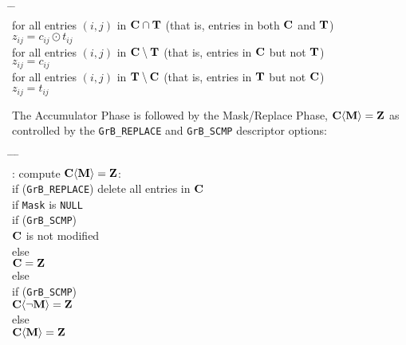 \documentclass[12pt]{article}
\begin{document}
    {\small
    \begin{tabbing}
    \hspace{2em} \= \hspace{2em} \= \hspace{2em} \= \\
    \> for all entries $(i,j)$ in ${\bf C \cap T}$
    (that is, entries in both ${\bf C}$ and ${\bf T}$) \\
    \> \> $z_{ij} = c_{ij} \odot t_{ij}$ \\
    \> for all entries $(i,j)$ in ${\bf C \setminus T}$
    (that is, entries in ${\bf C}$ but not ${\bf T}$) \\
    \> \> $z_{ij} = c_{ij}$ \\
    \> for all entries $(i,j)$ in ${\bf T \setminus C}$
    (that is, entries in ${\bf T}$ but not ${\bf C}$) \\
    \> \> $z_{ij} = t_{ij}$
    \end{tabbing} }
The Accumulator Phase is followed by the Mask/Replace Phase, ${\bf C \langle M \rangle = Z}$
as controlled by the \verb'GrB_REPLACE' and \verb'GrB_SCMP' descriptor options:
    \vspace{-0.2in}
    {\small
    \begin{tabbing}
    \hspace{2em} \= \hspace{2em} \= \hspace{2em} \= \hspace{2em} \= \\
    : compute ${\bf C \langle M \rangle = Z}$: \\
    \> \> if (\verb'GrB_REPLACE') delete all entries in ${\bf C}$ \\
    \> \> if \verb'Mask' is \verb'NULL' \\
    \> \>\>    if (\verb'GrB_SCMP') \\
    \> \>\>\>      ${\bf C}$ is not modified \\
    \> \>\>    else \\
    \> \>\>\>      ${\bf C = Z}$ \\
    \> \> else \\
    \> \>\>    if (\verb'GrB_SCMP') \\
    \> \>\>\>      ${\bf C \langle \neg M \rangle  = Z}$ \\
    \> \>\>    else \\
    \> \>\>\>      ${\bf C \langle M \rangle  = Z}$
    \end{tabbing} }
\end{document}
